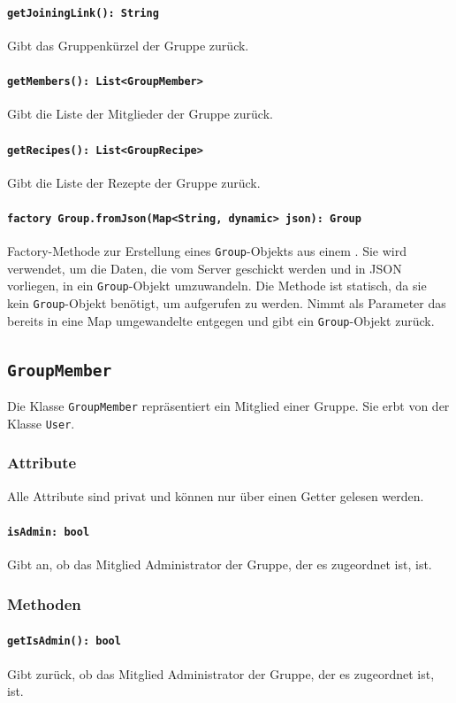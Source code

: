 \documentclass{entwurfsheft}
\begin{document}
\paragraph{\texttt{getJoiningLink(): String}}
Gibt das Gruppenkürzel der Gruppe zurück.
\paragraph{\texttt{getMembers(): List<GroupMember>}}
Gibt die Liste der Mitglieder der Gruppe zurück.
\paragraph{\texttt{getRecipes(): List<GroupRecipe>}}
Gibt die Liste der Rezepte der Gruppe zurück.
\paragraph{\texttt{factory Group.fromJson(Map<String, dynamic> json): Group}} Factory-Methode zur Erstellung eines \texttt{Group}-Objekts aus einem . Sie wird verwendet, um die Daten, die vom Server geschickt werden und in \Gls{JSON} vorliegen, in ein \texttt{Group}-Objekt umzuwandeln. Die Methode ist statisch, da sie kein \texttt{Group}-Objekt benötigt, um aufgerufen zu werden. Nimmt als Parameter das bereits in eine Map umgewandelte  entgegen und gibt ein \texttt{Group}-Objekt zurück.

\newpage
\subsection{\texttt{GroupMember}}\label{sec:groupmember}
Die Klasse \texttt{GroupMember} repräsentiert ein Mitglied einer Gruppe. Sie erbt von der Klasse \texttt{User}.
\subsubsection*{Attribute}
Alle Attribute sind privat und können nur über einen Getter gelesen werden.
\paragraph{\texttt{isAdmin: bool}}
Gibt an, ob das Mitglied Administrator der Gruppe, der es zugeordnet ist, ist.
\subsubsection*{Methoden}
\paragraph{\texttt{getIsAdmin(): bool}}
Gibt zurück, ob das Mitglied Administrator der Gruppe, der es zugeordnet ist, ist.
\end{document}
